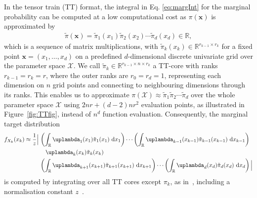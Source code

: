 In the tensor train (TT) format, the integral in Eq. \ref{eq:margInt} for the marginal probability can be computed at a low computational cost as $\pi(\bm{x})$ is approximated by
\begin{align*}
	\tilde{\pi}(\bm{x}) = 	\tilde{\pi}_1(x_1)  \tilde{\pi}_2(x_2)  \cdots \tilde{\pi}_d(x_d)  \in \mathbb{R},
\end{align*}
which is a sequence of matrix multiplications, with $\tilde{\pi}_k(x_k) \in \mathbb{R}^{r_{k-1} \times r_k}$ for a fixed point $\bm{x} = (x_1, \dots, x_d)$ on a predefined $d$-dimensional discrete univariate grid over the parameter space $\mathcal{X}$. 
We call $\tilde{\pi}_k \in \mathbb{R}^{r_{k-1} \times n \times r_k}$ a TT-core with ranks $ r_{k-1} = r_k= r$, where the outer ranks are $r_0 = r_d = 1$, representing each dimension on $n$ grid points and connecting to neighbouring dimensions through its ranks.
This enables us to approximate $\pi(\mathcal{X})\approx \tilde{\pi}_1  \tilde{\pi}_2  \cdots \tilde{\pi}_d$ over the whole parameter space $\mathcal{X}$ using $2nr + (d-2)nr^2$ evaluation points, as illustrated in Figure~\ref{fig:TTfig}, instead of $n^d$ function evaluation.
Consequently, the marginal target distribution
\begin{align}
	\begin{split}
		f_{X_k}(x_k) \approx \frac{1}{z} \Big|\, 
		&\left( \int_{\mathbb{R}} \uplambda_1(x_1) \tilde{\pi}_1(x_1) \, \diff x_1 \right) \cdots 
		\left( \int_{\mathbb{R}} \uplambda_{k-1}(x_{k-1}) \tilde{\pi}_{k-1}(x_{k-1}) \, \diff x_{k-1} \right) \\
		&\quad \uplambda_k(x_k) \tilde{\pi}_k(x_k) \\
		& \left( \int_{\mathbb{R}} \uplambda_{k+1}(x_{k+1}) \tilde{\pi}_{k+1}(x_{k+1}) \,\diff x_{k+1} \right) \cdots 
		\left( \int_{\mathbb{R}} \uplambda_d(x_d) \tilde{\pi}_d(x_d) \, \diff x_d \right)
		\Big| 
	\end{split}
\end{align}
is computed by integrating over all TT cores except $\pi_k$, as in~\cite{dolgov2020approximation}, including a normalisation constant $z$~\cite{cui2022deep}.

